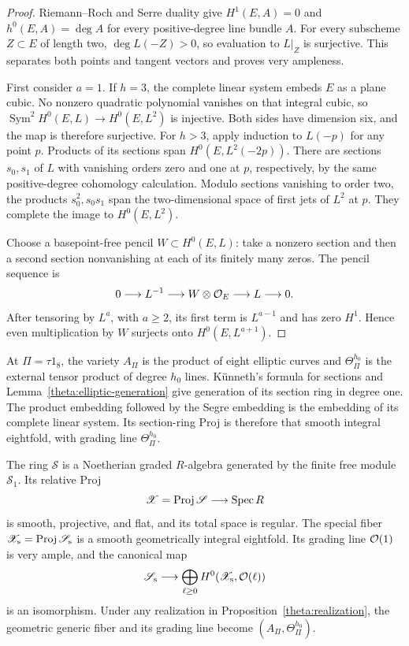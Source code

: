 \begin{proof}
Riemann--Roch and Serre duality give $H^1(E,A)=0$ and
$h^0(E,A)=\deg A$ for every positive-degree line bundle $A$.
For every subscheme $Z\subset E$ of length two,
$\deg L(-Z)>0$, so evaluation to $L|_Z$ is surjective.
This separates both points and tangent vectors and proves very ampleness.

First consider $a=1$.  If $h=3$, the complete linear system embeds $E$
as a plane cubic.  No nonzero quadratic polynomial vanishes on that
integral cubic, so
$\operatorname{Sym}^2H^0(E,L)\to H^0(E,L^2)$ is injective.
Both sides have dimension six, and the map is therefore surjective.
For $h>3$, apply induction to $L(-p)$ for any point $p$.
Products of its sections span $H^0(E,L^2(-2p))$.
There are sections $s_0,s_1$ of $L$ with vanishing orders zero and one at
$p$, respectively, by the same positive-degree cohomology calculation.
Modulo sections vanishing to order two, the products $s_0^2,s_0s_1$
span the two-dimensional space of first jets of $L^2$ at $p$.
They complete the image to $H^0(E,L^2)$.

Choose a basepoint-free pencil $W\subset H^0(E,L)$: take a nonzero
section and then a second section nonvanishing at each of its finitely
many zeros.  The pencil sequence is
\[
 0\longrightarrow L^{-1}\longrightarrow W\otimes\mathcal O_E
       \longrightarrow L\longrightarrow0.
\]
After tensoring by $L^a$, with $a\geq2$, its first term is $L^{a-1}$
and has zero $H^1$.  Hence even multiplication by $W$ surjects onto
$H^0(E,L^{a+1})$.
\end{proof}

At $\Pi=\tau1_8$, the variety $A_\Pi$ is the product of eight elliptic
curves and $\Theta_\Pi^{h_0}$ is the external tensor product of degree
$h_0$ lines.  K\"unneth's formula for sections and
Lemma~\ref{theta:elliptic-generation} give generation of its section ring
in degree one.  The product embedding followed by the Segre embedding
is the embedding of its complete linear system.  Its section-ring Proj
is therefore that smooth integral eightfold, with grading line
$\Theta_\Pi^{h_0}$.

\begin{proposition}\label{theta:family}
The ring $\mathscr S$ is a Noetherian graded $R$-algebra generated by the
finite free module $\mathscr S_1$.  Its relative Proj
\[
 \mathscr X=\operatorname{Proj}\mathscr S\longrightarrow\operatorname{Spec} R
\]
is smooth, projective, and flat, and its total space is regular.
The special fiber
$\mathscr X_{\mathrm s}=\operatorname{Proj}\mathscr S_{\mathrm s}$ is a smooth
geometrically integral eightfold.  Its grading line $\mathcal O(1)$ is very
ample, and the canonical map
\[
 \mathscr S_{\mathrm s}\longrightarrow
 \bigoplus_{\ell\geq0}H^0(\mathscr X_{\mathrm s},\mathcal O(\ell))
\]
is an isomorphism.  Under any realization in
Proposition~\ref{theta:realization}, the geometric generic fiber and its
grading line become $(A_\Pi,\Theta_\Pi^{h_0})$.
\end{proposition}

